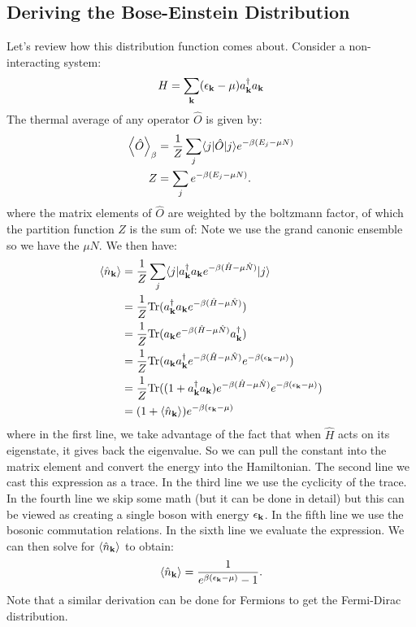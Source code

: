\subsection{Deriving the Bose-Einstein Distribution}
Let's review how this distribution function comes about. Consider a non-interacting system:
\begin{equation}
    H = \sum_{\mathbf{k}}(\epsilon_{\mathbf{k}} - \mu)a^\dagger_{\mathbf{k}}a_{\mathbf{k}}
\end{equation}
The thermal average of any operator $\hat{O}$ is given by:
\begin{equation}
    \begin{split}
        \left< \hat{O} \right>_\beta &= \frac{1}{Z}\sum_j \langle j \rvert\hat{O}\lvert j \rangle e^{-\beta (E_j - \mu N)}
    \\  Z &= \sum_j e^{-\beta (E_j - \mu N)}.
    \end{split}
\end{equation}
where the matrix elements of $\hat{O}$ are weighted by the boltzmann factor, of which the partition function $Z$ is the sum of:
Note we use the grand canonic ensemble so we have the $\mu N$. We then have:
\begin{equation}
    \begin{split}
        \left< \hat{n}_{\mathbf{k}} \right> &= \frac{1}{Z}\sum_j \langle j \rvert a^\dagger_{\mathbf{k}}a_{\mathbf{k}}e^{-\beta(\hat{H} - \mu\hat{N})}\lvert j \rangle
        \\ &= \frac{1}{Z}\mathrm{Tr}(a_{\mathbf{k}}^\dagger a_{\mathbf{k}} e^{-\beta(\hat{H} - \mu\hat{N})})
        \\ &= \frac{1}{Z}\mathrm{Tr}(a_{\mathbf{k}} e^{-\beta(\hat{H} - \mu\hat{N})}a_{\mathbf{k}}^\dagger)
        \\ &= \frac{1}{Z}\mathrm{Tr}(a_{\mathbf{k}} a_{\mathbf{k}}^\dagger e^{-\beta(\hat{H} - \mu\hat{N})}e^{-\beta(\epsilon_{\mathbf{k}} - \mu)})
        \\ &= \frac{1}{Z}\mathrm{Tr}((1 + a_{\mathbf{k}}^\dagger a_{\mathbf{k}}) e^{-\beta(\hat{H} - \mu\hat{N})}e^{-\beta(\epsilon_{\mathbf{k}} - \mu)})
        \\ &= (1 + \left< \hat{n}_{\mathbf{k}} \right>)e^{-\beta(\epsilon_{\mathbf{k}} - \mu)}
    \end{split}
\end{equation}
where in the first line, we take advantage of the fact that when $\hat{H}$ acts on its eigenstate, it gives back the eigenvalue. So we can pull the constant into the matrix element and convert the energy into the Hamiltonian. The second line we cast this expression as a trace. In the third line we use the cyclicity of the trace. In the fourth line we skip some math (but it can be done in detail) but this can be viewed as creating a single boson with energy $\epsilon_{\mathbf{k}}$. In the fifth line we use the bosonic commutation relations. In the sixth line we evaluate the expression. We can then solve for $\left< \hat{n}_{\mathbf{k}} \right>$ to obtain:
\begin{equation}
    \left< \hat{n}_{\mathbf{k}} \right> = \frac{1}{e^{\beta(\epsilon_{\mathbf{k}} - \mu)} - 1}.
\end{equation}
Note that a similar derivation can be done for Fermions to get the Fermi-Dirac distribution.

